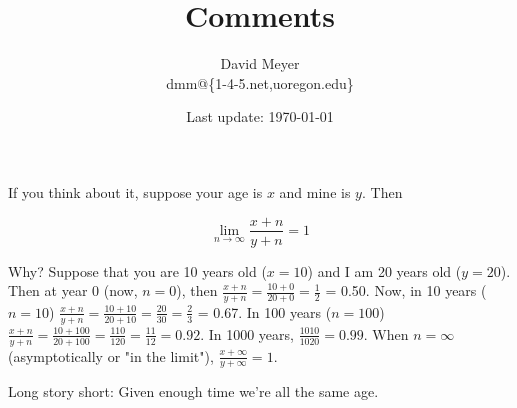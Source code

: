 \documentclass[11pt, oneside]{article}   	%
\title{Comments}
\author{David Meyer \\ dmm@\{1-4-5.net,uoregon.edu\}}
\date{Last update: \today}							%
\begin{document}
\maketitle

\bigskip
\noindent
If you think about it, suppose your age is $x$ and mine is $y$. Then

\begin{equation*}
\lim_{n \rightarrow \infty} \frac{x + n}{y + n} = 1
\end{equation*}

\bigskip
\noindent
Why? Suppose that you are 10 years old ($x = 10$) and I am 20 years old ($y = 20$). Then at year $0$ (now, $n = 0$), then  
$\frac{x + n}{y + n} =  \frac{10 + 0}{20 + 0}  = \frac{1}{2}$ = 0.50.  Now,  in 10 years ($n = 10$) $\frac{x + n}{y + n} =  
\frac{10 + 10}{20 + 10}  = \frac{20}{30} = \frac{2}{3}$ = 0.67. In 100 years ($n = 100$)  $\frac{x + n}{y + n} =  \frac{10 + 100}{20 + 100}  
= \frac{110}{120} = \frac{11}{12} = 0.92$.  In 1000 years, $\frac{1010}{1020} = 0.99$. When $n = \infty$ (asymptotically or "in the limit"), 
$\frac{x + \infty}{y + \infty} = 1$.
 
\bigskip
\noindent
{\Large Long story short:  Given enough time we're all the same age.}

\newpage


\end{document}

